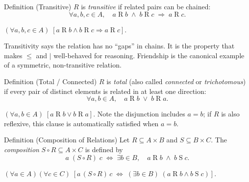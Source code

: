 \begin{definitionbox}{Definition (Transitive)}
\label{def:rel-transitive}
$R$ is \emph{transitive} if related pairs can be chained:
\[
  \forall a,b,c \in A,\quad
  a \mathrel{R} b \;\land\; b \mathrel{R} c \;\Rightarrow\; a \mathrel{R} c.
\]
\end{definitionbox}

\begin{remark}
$(\forall a,b,c \in A)\;
[a \mathrel{R} b \land b \mathrel{R} c \Rightarrow a \mathrel{R} c]$.
\end{remark}

\begin{remark}[Intuition]
Transitivity says the relation has no ``gaps'' in chains.
It is the property that makes $\leq$ and $\mid$ well-behaved for reasoning.
Friendship is the canonical example of a symmetric, non-transitive relation.
\end{remark}

\begin{definitionbox}{Definition (Total / Connected)}
\label{def:rel-total}
$R$ is \emph{total} (also called \emph{connected} or \emph{trichotomous})
if every pair of distinct elements is related in at least one direction:
\[
  \forall a,b \in A,\quad
  a \mathrel{R} b \;\lor\; b \mathrel{R} a.
\]
\end{definitionbox}

\begin{remark}
$(\forall a,b \in A)\;[a \mathrel{R} b \lor b \mathrel{R} a]$.
Note the disjunction includes $a = b$; if $R$ is also reflexive, this
clause is automatically satisfied when $a = b$.
\end{remark}


\begin{definitionbox}{Definition (Composition of Relations)}
\label{def:rel-composition}
Let $R \subseteq A \times B$ and $S \subseteq B \times C$.
The \emph{composition} $S \circ R \subseteq A \times C$ is defined by
\[
  a \;(S \circ R)\; c
  \;\iff\;
  \exists b \in B,\quad a \mathrel{R} b \;\land\; b \mathrel{S} c.
\]
\end{definitionbox}

\begin{remark}
$(\forall a \in A)(\forall c \in C)\;
[a\,(S\circ R)\,c
\;\iff\;
(\exists b \in B)\;(a \mathrel{R} b \land b \mathrel{S} c)]$.
\end{remark}

